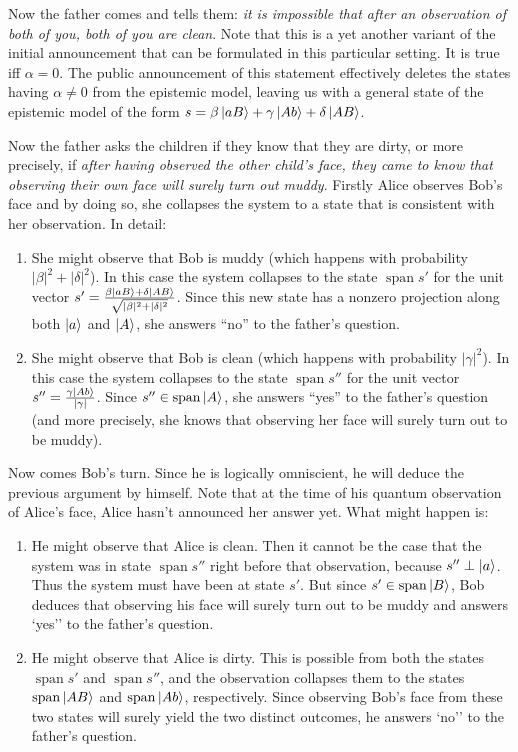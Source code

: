 \documentclass[a4paper]{article}
\DeclareMathOperator{\spn}{span}
\begin{document}
Now the father comes and tells them: \emph{it is impossible that after an
observation of both of you, both of you are clean}. Note that this is a yet
another variant of the initial announcement that can be formulated in this
particular setting. It is true iff $\alpha = 0$. The public announcement of this
statement effectively deletes the states having $\alpha \neq 0$ from the
epistemic model, leaving us with a general state of the epistemic model of the
form $s = \beta\ket{aB} + \gamma\ket{Ab} + \delta\ket{AB}$.

Now the father asks the children if they know that they are dirty, or more
precisely, if \emph{after having observed the other child's face, they came to 
know that observing their own face will surely turn out muddy}. Firstly Alice
observes Bob's face and by doing so, she collapses the system to a state that is
consistent with her observation. In detail:
\begin{enumerate}
\item She might observe that Bob is muddy (which happens with probability
    $|\beta|^2 + |\delta|^2$). In this case the system collapses to the state
    $\spn s'$ for the unit vector $s' = \frac{\beta\ket{aB} +
    \delta\ket{AB}}{\sqrt{|\beta|^2 + |\delta|^2}}$. Since this new state has a
    nonzero projection along both $\ket{a}$ and $\ket{A}$, she answers ``no'' to
    the father's question.

\item She might observe that Bob is clean (which happens with probability
    $|\gamma|^2$). In this case the system collapses to the state $\spn{s''}$
    for the unit vector $s'' = \frac{\gamma\ket{Ab}}{|\gamma|}$. Since $s'' \in
    \spn\ket{A}$, she answers ``yes'' to the father's question (and more
    precisely, she knows that observing her face will surely turn out to be
    muddy).
\end{enumerate}

Now comes Bob's turn. Since he is logically omniscient, he will deduce the
previous argument by himself. Note that at the time of his quantum observation
of Alice's face, Alice hasn't announced her answer yet. What might happen is:
\begin{enumerate}
\item He might observe that Alice is clean. Then it cannot be the case that the
    system was in state $\spn s''$ right before that observation, because $s''
    \perp \ket{a}$. Thus the system must have been at state $s'$.  But since $s'
    \in \spn \ket{B}$, Bob deduces that observing his face will surely turn out
    to be muddy and answers `yes'' to the father's question.

\item He might observe that Alice is dirty. This is possible from both the
    states $\spn s'$ and $\spn s''$, and the observation collapses them to the
    states $\spn\ket{AB}$ and $\spn\ket{Ab}$, respectively. Since observing
    Bob's face from these two states will surely yield the two distinct
    outcomes, he answers `no'' to the father's question.
\end{enumerate}
\end{document}
